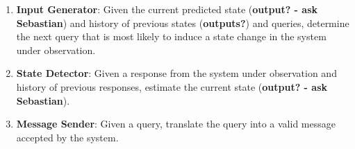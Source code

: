 \documentclass[11pt, a4paper]{article}
\begin{document}
\begin{enumerate}
    \item \textbf{Input Generator}: Given the current predicted state (\textbf{output? - ask Sebastian}) and history of previous states (\textbf{outputs?}) and queries, determine the next query that is most likely to induce a state change in the system under observation.
    \item \textbf{State Detector}: Given a response from the system under observation and history of previous responses, estimate the current state (\textbf{output? - ask Sebastian}).
    \item \textbf{Message Sender}: Given a query, translate the query into a valid message accepted by the system.
\end{enumerate}

\nocite*{}
{}

\end{document}
